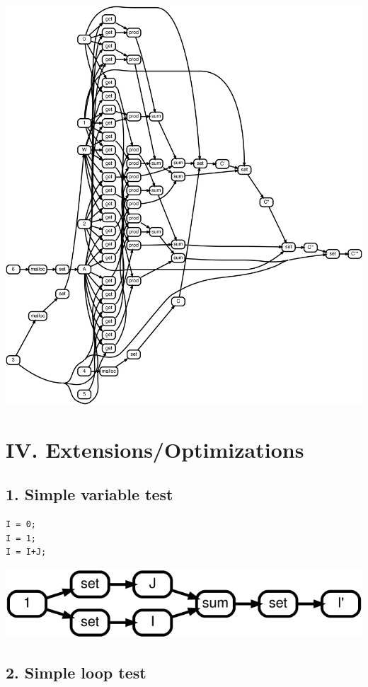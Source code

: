 \documentclass[11pt]{article}
\begin{document}
\includegraphics[scale=0.25]{rtd34}

\pagebreak\section*{IV. Extensions/Optimizations}

\subsection*{1. Simple variable test}

\begin{lstlisting}
I = 0;
I = 1;
I = I+J;
\end{lstlisting}

\includegraphics[scale=0.25]{rtd41}

\pagebreak\subsection*{2. Simple loop test}
\end{document}

